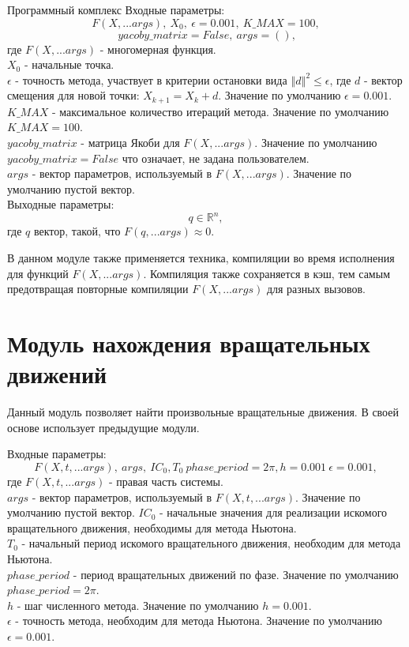 \begin{chapter}{Программный комплекс}
Входные параметры: $$
F(X, ...args),  \ X_0, \ \epsilon=0.001, \ K\_MAX=100,
$$
$$
\ yacoby\_matrix=False, \ args = (),$$
где $F(X, ...args)$ - многомерная функция. \\
$X_0$ - начальные точка. \\
$\epsilon$ - точность метода, участвует в критерии остановки вида $\left\Vert d \right\Vert^2 \le \epsilon$, где $d$ - вектор смещения для новой точки: $X_{k+1} = X_k + d$. Значение по умолчанию $\epsilon = 0.001$. \\
$K\_MAX$ - максимальное количество итераций метода. Значение по умолчанию $K\_MAX = 100$. \\
$yacoby\_matrix$ - матрица Якоби для $F(X, ...args)$. Значение по умолчанию $yacoby\_matrix=False$ что означает, не задана пользователем. \\
$args$ - вектор параметров, используемый в $F(X, ...args)$. Значение по умолчанию пустой вектор. \\
Выходные параметры: $$ q \in \mathbb{R}^n,$$
где $q$ вектор, такой, что $F(q, ...args) \approx 0$.

В данном модуле также применяется техника, компиляции во время исполнения 
для функций $F(X, ...args)$. Компиляция также сохраняется в кэш, тем
самым предотвращая повторные компиляции $F(X, ...args)$ для разных вызовов.


\section{Модуль нахождения вращательных движений}
Данный модуль позволяет найти произвольные вращательные движения.
В своей основе использует предыдущие модули.

Входные параметры: $$F(X, t, ...args), \ args, \ IC_0, T_0 \ phase\_period = 2\pi, h=0.001\ \epsilon=0.001,$$
где $F(X, t, ...args)$ - правая часть системы. \\
$args$ - вектор параметров, используемый в $F(X, t, ...args)$. Значение по умолчанию пустой вектор.
$IC_0$ - начальные значения для реализации искомого вращательного движения, необходимы для метода Ньютона. \\
$T_0$ - начальный период искомого вращательного движения, необходим для метода Ньютона. \\
$phase\_period$ - период  вращательных движений по фазе. Значение по умолчанию $phase\_period = 2\pi$. \\
$h$ - шаг численного метода. Значение по умолчанию $h = 0.001$. \\
$\epsilon$ - точность метода, необходим для метода Ньютона. Значение по умолчанию $\epsilon = 0.001$.


\end{chapter}
